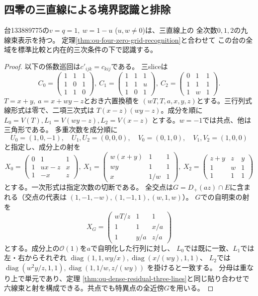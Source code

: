 \subsection{四零の三直線による境界認識と排除}
\label{subsec:ou-four-zero-triangles}

\begin{theorem}[133889775の全域認識]
\label{thm:ou-four-zero-triangle}
台133889775の$v=q=1,\ w=1-u$ ($u,w\ne0$)は、三直線上の
全次数$0,1,2$の九線束表示を持つ。
定理\ref{thm:ou-four-zero-grid-recognition}と合わせて
この台の全域を標準比較と内在的三次条件の下で認識する。
\end{theorem}
\begin{proof}
以下の係数巡回は$c'_{ijk}=c_{kij}$である。
三sliceは
\[
 C_0=\begin{pmatrix}1&1&1\\1&0&1\\1&1&0\end{pmatrix},\
 C_1=\begin{pmatrix}1&1&1\\1&1&u\\1&0&1\end{pmatrix},\
 C_2=\begin{pmatrix}0&1&1\\1&1&1\\1&w&1\end{pmatrix}.
\]
$T=x+y,\ a=x+wy-z$とおき六置換積を
$(wT,T,a,x,y,z)$とする。三行列式線形式は零で、二項三次式は
$T(x-z)(wy-z)$。成分を順に$L_0=V(T),L_1=V(wy-z),L_2=V(x-z)$
とする。$w=-1$では共点、他は三角形である。
多重次数を成分順に
\[
 U_0=(1,0,-1),\quad U_1,U_2=(0,0,0),\quad
 V_0=(0,1,0),\quad V_1,V_2=(1,0,0)
\]
と指定し、成分上の射を
\[
 X_0=\begin{pmatrix}0&1&1\\1&ux-z&x\\1&-x&z\end{pmatrix},\
 X_1=\begin{pmatrix}w(x+y)&1&1\\wy&1&1\\x&1/w&1\end{pmatrix},\
 X_2=\begin{pmatrix}z+y&z&y\\1&w&1\\1&1&1\end{pmatrix}
\]
とする。一次形式は指定次数の切断である。
全交点は$G=D_+(az)\cap E$に含まれる（交点の代表は
$(1,-1,-w),(1,-1,1),(w,1,w)$）。
$G$での自明束の射を
\[
 X_G=\begin{pmatrix}wT/z&1&1\\1&1&x/a\\1&y/a&z/a\end{pmatrix}
\]
とする。成分上の$\mathcal O(1)$を$a$で自明化した行列に対し、
$L_0$では既に一致、$L_1$では左・右からそれぞれ
$\operatorname{diag}(1,1,wy/x),\operatorname{diag}(x/(wy),1,1)$、
$L_2$では
$\operatorname{diag}(w^2y/z,1,1),\operatorname{diag}(1,1/w,z/(wy))$
を掛けると一致する。
分母は重なり上で単元であり、定理
\ref{thm:ou-dense-residual-three-lines}と同じ貼り合わせで
六線束と射を構成できる。共点でも特異点の全近傍$G$を用いる。


\end{proof}
